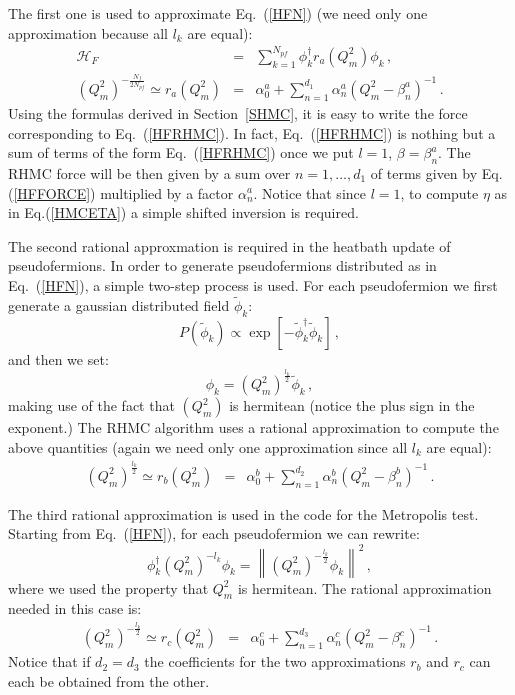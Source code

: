 \documentclass{article}[12pt]
\begin{document}
The first one is used to approximate Eq.~(\ref{HFN}) (we need only one approximation because all $l_k$ are equal):
\begin{eqnarray}
\mathcal{H}_F &=& \sum_{k=1}^{N_{pf}} \phi_k^\dagger r_{a}( Q_m^2 )\phi_k \, , \label{HFRHMC}\\
( Q_m^2 )^{-\frac{N_f}{2N_{pf}}} \simeq r_{a}(Q_m^2) &=& \alpha_0^a + \sum_{n=1}^{d_{1}} \alpha_n^a ( Q^2_m - \beta_n^a )^{-1} \, .
\end{eqnarray}
Using the formulas derived in Section~\ref{SHMC}, it is easy to write the force corresponding to Eq.~(\ref{HFRHMC}).
In fact, Eq.~(\ref{HFRHMC}) is nothing but a sum of terms of the form Eq.~(\ref{HFRHMC}) once we put $l=1$, $\beta=\beta_n^a$.
The RHMC force will be then given by a sum over $n=1,\dots,d_1$ of terms given by Eq.(\ref{HFFORCE}) multiplied by a factor $\alpha_n^a$.
Notice that since $l=1$, to compute $\eta$ as in Eq.(\ref{HMCETA}) a simple shifted inversion is required.

The second rational approxmation is required in the heatbath update of pseudofermions.
In order to generate pseudofermions distributed as in Eq.~(\ref{HFN}), a simple two-step process is used.
For each pseudofermion we first generate a gaussian distributed field $\tilde\phi_k$:
\begin{equation}
P(\tilde\phi_k)\propto \exp [ -\tilde\phi_k^\dagger \tilde\phi_k ] \, ,
\end{equation}
and then we set:
\begin{equation}
\phi_k = (Q_m^2)^{\frac{l_k}{2}} \tilde\phi_k \, ,
\end{equation}
making use of the fact that $(Q_m^2)$ is hermitean (notice the plus sign in the exponent.)
The RHMC algorithm uses a rational approximation to compute the above quantities (again we need only one
approximation since all $l_k$ are equal):
\begin{eqnarray}
( Q_m^2 )^{\frac{l_k}{2}} \simeq r_{b}(Q_m^2) &=& \alpha_0^b + \sum_{n=1}^{d_{2}} \alpha_n^b ( Q^2_m - \beta_n^b )^{-1} \, .
\end{eqnarray}

The third rational approximation is used in the code for the Metropolis test.
Starting from Eq.~(\ref{HFN}), for each pseudofermion we can rewrite:
\begin{equation}
\phi_k^\dagger ( Q_m^2 )^{-l_k}\phi_k = \left\| (Q_m^2)^{-\frac{l_k}{2}} \phi_k \right\|^2\, ,
\end{equation}
where we used the property that $Q_m^2$ is hermitean.
The rational approximation needed in this case is:
\begin{eqnarray}
( Q_m^2 )^{-\frac{l_k}{2}} \simeq r_{c}(Q_m^2) &=& \alpha_0^c + \sum_{n=1}^{d_{3}} \alpha_n^c ( Q^2_m - \beta_n^c )^{-1} \, .
\end{eqnarray}
Notice that if $d_2=d_3$ the coefficients for the two approximations $r_b$ and $r_c$ can each be obtained from the other.
\end{document}
